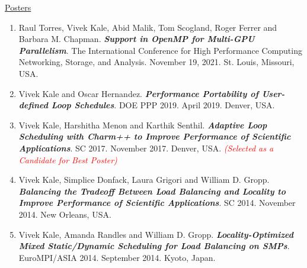 \underline{Posters}
\begin{enumerate}
\item Raul Torres, Vivek Kale, Abid Malik, Tom Scogland, Roger Ferrer and Barbara M. Chapman. \textbf{\textit{Support in OpenMP for Multi-GPU Parallelism}}. The International Conference for High Performance Computing Networking, Storage, and Analysis. November 19, 2021. St. Louis, Missouri, USA.
\item Vivek Kale and Oscar Hernandez. {\bf\textit{Performance Portability of User-defined Loop Schedules}}. DOE PPP 2019. April 2019. Denver, USA.
\item Vivek Kale, Harshitha Menon and Karthik Senthil. \textbf{\textit{Adaptive Loop Scheduling with Charm++ to Improve Performance of Scientific Applications}}. SC 2017. November 2017. Denver, USA. \textit{\textcolor{red}{(Selected as a Candidate for Best Poster)}}
\item Vivek Kale, Simplice Donfack, Laura Grigori and William D. Gropp. \textbf{\textit{Balancing the Tradeoff Between Load Balancing and Locality to Improve Performance of Scientific Applications}}. SC 2014. November 2014. New Orleans, USA.
\item Vivek Kale, Amanda Randles and William D. Gropp. \textbf{\textit{Locality-Optimized Mixed Static/Dynamic
      Scheduling for Load Balancing on SMPs}}. EuroMPI/ASIA 2014. September 2014. Kyoto, Japan.
\end{enumerate}



